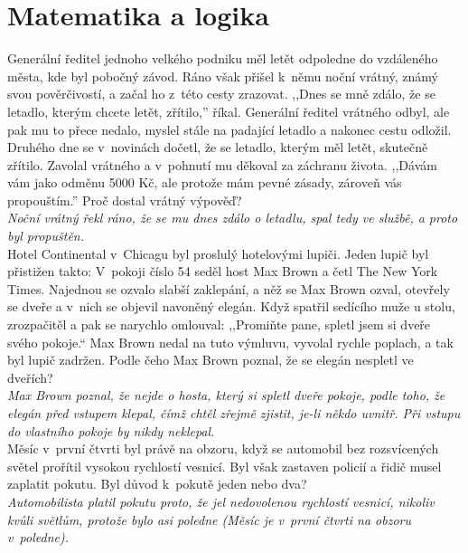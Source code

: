 
\section{Matematika a logika}
\begin{multicols}{2}

\noindent
Generální ředitel jednoho velkého podniku měl letět odpoledne
do vzdáleného města, kde byl pobočný závod. Ráno však přišel
k~němu noční vrátný, známý svou pověrčivostí, a začal
ho z~této cesty zrazovat. ,,Dnes se mně zdálo, že se letadlo,
kterým chcete letět, zřítilo,'' říkal. Generální ředitel vrátného
odbyl, ale pak mu to přece nedalo, myslel stále na padající letadlo
a nakonec cestu odložil. Druhého dne se v~novinách dočetl,
že se letadlo, kterým měl letět, skutečně zřítilo. Zavolal vrátného
a v~pohnutí mu děkoval za záchranu života. ,,Dávám vám
jako odměnu 5000 Kč, ale protože mám pevné zásady, zároveň vás
propouštím.'' Proč dostal vrátný výpověď?\\[1 mm]
{\sl Noční vrátný řekl ráno, že se mu dnes zdálo o letadlu, spal
tedy ve službě, a proto byl propuštěn.}\\

\noindent
Hotel Continental v~Chicagu byl proslulý hotelovými
lupiči. Jeden lupič byl přistižen takto: V~pokoji číslo
54 seděl host Max Brown a četl The New York Times. Najednou se
ozvalo slabší zaklepání, a něž se Max Brown ozval, otevřely se
dveře a v~nich se objevil navoněný elegán. Když spatřil
sedícího muže u stolu, zrozpačitěl a pak se narychlo omlouval:
,,Promiňte pane, spletl jsem si dveře svého pokoje.`` Max Brown
nedal na tuto výmluvu, vyvolal rychle poplach, a tak byl lupič
zadržen. Podle čeho Max Brown poznal, že se elegán nespletl ve
dveřích?\\[1 mm]
{\sl Max Brown poznal, že nejde o hosta, který si spletl dveře
pokoje, podle toho, že elegán před vstupem klepal, čímž chtěl
zřejmě zjistit, je-li někdo uvnitř. Při vstupu do vlastního pokoje
by nikdy neklepal.}\\

\noindent
Měsíc v~první čtvrti byl právě na obzoru, když
se automobil bez rozsvícených světel prořítil vysokou rychlostí
vesnicí. Byl však zastaven policií a řidič musel zaplatit pokutu.
Byl důvod k~pokutě jeden nebo dva?\\[1 mm]
{\sl Automobilista platil pokutu proto, že jel nedovolenou rychlostí
vesnicí, nikoliv kvůli světlům, protože bylo asi poledne (Měsíc
je v~první čtvrti na obzoru v~poledne).}\\


\end{multicols}
